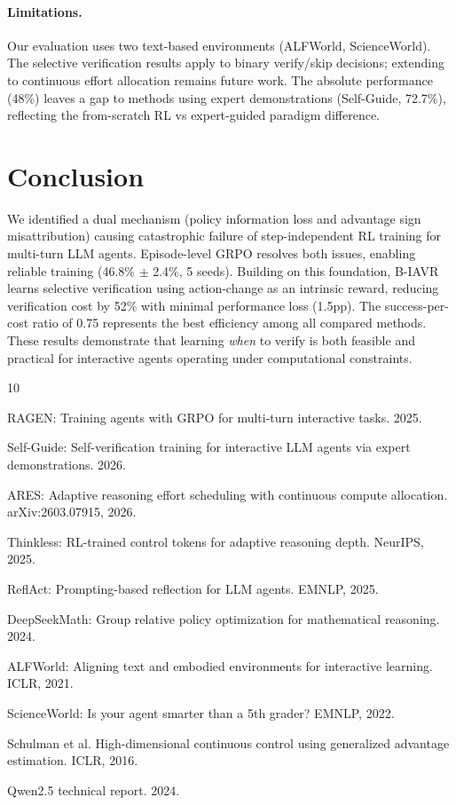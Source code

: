 \documentclass[11pt]{article}
\begin{document}
\paragraph{Limitations.}
Our evaluation uses two text-based environments (ALFWorld, ScienceWorld). The selective verification results apply to binary verify/skip decisions; extending to continuous effort allocation remains future work. The absolute performance (48\%) leaves a gap to methods using expert demonstrations (Self-Guide, 72.7\%), reflecting the from-scratch RL vs expert-guided paradigm difference.

\section{Conclusion}

We identified a dual mechanism (policy information loss and advantage sign misattribution) causing catastrophic failure of step-independent RL training for multi-turn LLM agents. Episode-level GRPO resolves both issues, enabling reliable training (46.8\% $\pm$ 2.4\%, 5 seeds). Building on this foundation, B-IAVR learns selective verification using action-change as an intrinsic reward, reducing verification cost by 52\% with minimal performance loss (1.5pp). The success-per-cost ratio of 0.75 represents the best efficiency among all compared methods. These results demonstrate that learning \emph{when} to verify is both feasible and practical for interactive agents operating under computational constraints.


\begin{thebibliography}{10}

RAGEN: Training agents with GRPO for multi-turn interactive tasks. 2025.

Self-Guide: Self-verification training for interactive LLM agents via expert demonstrations. 2026.

ARES: Adaptive reasoning effort scheduling with continuous compute allocation. arXiv:2603.07915, 2026.

Thinkless: RL-trained control tokens for adaptive reasoning depth. NeurIPS, 2025.

ReflAct: Prompting-based reflection for LLM agents. EMNLP, 2025.

DeepSeekMath: Group relative policy optimization for mathematical reasoning. 2024.

ALFWorld: Aligning text and embodied environments for interactive learning. ICLR, 2021.

ScienceWorld: Is your agent smarter than a 5th grader? EMNLP, 2022.

Schulman et al. High-dimensional continuous control using generalized advantage estimation. ICLR, 2016.

Qwen2.5 technical report. 2024.

\end{thebibliography}
\end{document}
